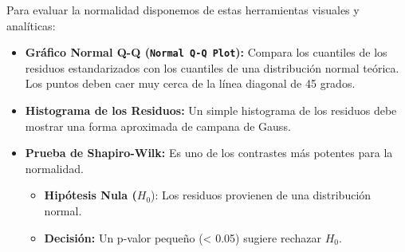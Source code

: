 \documentclass[
  letterpaper,
  DIV=11,
  numbers=noendperiod]{scrreprt}
\providecommand{\tightlist}{%
  \setlength{\itemsep}{0pt}\setlength{\parskip}{0pt}}
\begin{document}
Para evaluar la normalidad disponemos de estas herramientas visuales y
analíticas:

\begin{itemize}
\tightlist
\item
  \textbf{Gráfico Normal Q-Q (\texttt{Normal\ Q-Q\ Plot}):} Compara los
  cuantiles de los residuos estandarizados con los cuantiles de una
  distribución normal teórica. Los puntos deben caer muy cerca de la
  línea diagonal de 45 grados.
\item
  \textbf{Histograma de los Residuos:} Un simple histograma de los
  residuos debe mostrar una forma aproximada de campana de Gauss.
\item
  \textbf{Prueba de Shapiro-Wilk:} Es uno de los contrastes más potentes
  para la normalidad.

  \begin{itemize}
  \tightlist
  \item
    \textbf{Hipótesis Nula (}\(H_0\)): Los residuos provienen de una
    distribución normal.
  \item
    \textbf{Decisión:} Un p-valor pequeño (\textless{} 0.05) sugiere
    rechazar \(H_0\).
  \end{itemize}
\end{itemize}
\end{document}
